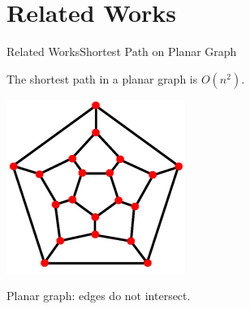 \documentclass{beamer}
\begin{document}
\section{Related Works}

\begin{frame}{Related Works}{Shortest Path on Planar Graph}
  \begin{theorem} 
    The shortest path in a planar graph is $O(n^2)$. \cite{henzinger1997faster}
  \end{theorem}
  \begin{center}
    \includegraphics[width=0.3\linewidth]{planar.png}
  \end{center}
  Planar graph: edges do not intersect.
\end{frame}
\end{document}
